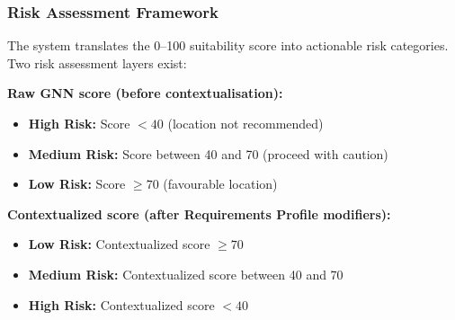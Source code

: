 \subsubsection{Risk Assessment Framework}
The system translates the 0--100 suitability score into actionable risk categories. Two risk assessment layers exist:

\textbf{Raw GNN score (before contextualisation):}
\begin{itemize}
	\item \textbf{High Risk:} Score $< 40$ (location not recommended)
	\item \textbf{Medium Risk:} Score between 40 and 70 (proceed with caution)
	\item \textbf{Low Risk:} Score $\geq 70$ (favourable location)
\end{itemize}

\textbf{Contextualized score (after Requirements Profile modifiers):}
\begin{itemize}
	\item \textbf{Low Risk:} Contextualized score $\geq 70$
	\item \textbf{Medium Risk:} Contextualized score between 40 and 70
	\item \textbf{High Risk:} Contextualized score $< 40$
\end{itemize}


